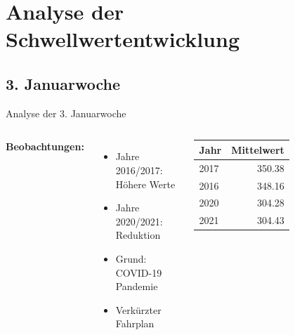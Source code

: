 \documentclass{beamer}
\begin{document}
\section{Analyse der Schwellwertentwicklung}

\subsection{3. Januarwoche}

\begin{frame}{Analyse der 3. Januarwoche}
  \begin{columns}[T]
    \textbf{Beobachtungen:}
    \begin{itemize}
      \item Jahre 2016/2017: Höhere Werte
      \item Jahre 2020/2021: Reduktion
      \item Grund: COVID-19 Pandemie
      \item Verkürzter Fahrplan
    \end{itemize}
    
    \begin{table}[H]
      \normalsize
      \centering
      \begin{tabular}{lr}
        \toprule
        Jahr & Mittelwert \\
        \midrule
        2017 & 350.38 \\
        2016 & 348.16 \\
        2020 & 304.28 \\
        2021 & 304.43 \\
        \bottomrule
      \end{tabular}
    \end{table}
  \end{columns}
\end{frame}
\end{document}
